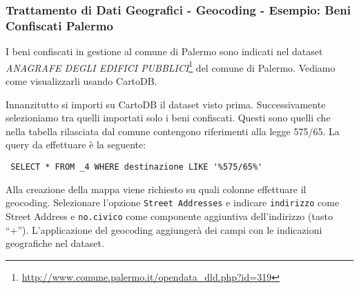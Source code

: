 \documentclass[8pt]{beamer}
\begin{document}
\begin{frame}[fragile]
 \frametitle{Trattamento di Dati Geografici - Geocoding - Esempio: Beni Confiscati Palermo}

 I beni confiscati in gestione al comune di Palermo sono indicati nel dataset
 \emph{ANAGRAFE DEGLI EDIFICI PUBBLICI}\footnote{\url{http://www.comune.palermo.it/opendata_dld.php?id=319}}
 del comune di Palermo. Vediamo come visualizzarli usando CartoDB.
 \vspace{\baselineskip}

 Innanzitutto si importi su CartoDB il dataset visto prima. Successivamente
 selezioniamo tra quelli importati solo i beni confiscati. Questi sono quelli
 che nella tabella rilasciata dal comune contengono riferimenti alla legge
 575/65. La query da effettuare \`e la seguente:
 \begin{verbatim}
 SELECT * FROM _4 WHERE destinazione LIKE '%575/65%'
 \end{verbatim}
 \vspace{\baselineskip}

 Alla creazione della mappa viene richiesto su quali colonne effettuare
 il geocoding. Selezionare l'opzione \texttt{Street Addresses} e indicare
 \texttt{indirizzo} come Street Address e \texttt{no.civico} come componente
 aggiuntiva dell'indirizzo (tasto ``+''). L'applicazione del geocoding aggiunger\`a
 dei campi con le indicazioni geografiche nel dataset.
\end{frame}
\end{document}
